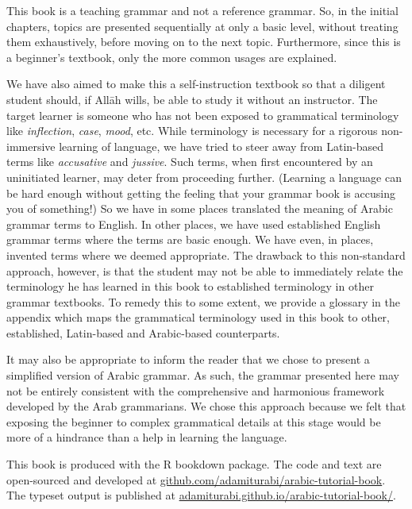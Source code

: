 \documentclass[
  10pt,
]{book}
\begin{document}
This book is a teaching grammar and not a reference grammar. So, in the initial chapters, topics are presented sequentially at only a basic level, without treating them exhaustively, before moving on to the next topic. Furthermore, since this is a beginner's textbook, only the more common usages are explained.

We have also aimed to make this a self-instruction textbook so that a diligent student should, if Allāh wills, be able to study it without an instructor. The target learner is someone who has not been exposed to grammatical terminology like \emph{inflection}, \emph{case}, \emph{mood}, etc. While terminology is necessary for a rigorous non-immersive learning of language, we have tried to steer away from Latin-based terms like \emph{accusative} and \emph{jussive}. Such terms, when first encountered by an uninitiated learner, may deter from proceeding further. (Learning a language can be hard enough without getting the feeling that your grammar book is accusing you of something!) So we have in some places translated the meaning of Arabic grammar terms to English. In other places, we have used established English grammar terms where the terms are basic enough. We have even, in places, invented terms where we deemed appropriate. The drawback to this non-standard approach, however, is that the student may not be able to immediately relate the terminology he has learned in this book to established terminology in other grammar textbooks. To remedy this to some extent, we provide a glossary in the appendix which maps the grammatical terminology used in this book to other, established, Latin-based and Arabic-based counterparts.

It may also be appropriate to inform the reader that we chose to present a simplified version of Arabic grammar. As such, the grammar presented here may not be entirely consistent with the comprehensive and harmonious framework developed by the Arab grammarians. We chose this approach because we felt that exposing the beginner to complex grammatical details at this stage would be more of a hindrance than a help in learning the language.

This book is produced with the R bookdown package. The code and text are open-sourced and developed at
\href{https://github.com/adamiturabi/arabic-tutorial-book}{github.com/adamiturabi/arabic-tutorial-book}.
The typeset output is published at
\href{https://adamiturabi.github.io/arabic-tutorial-book/}{adamiturabi.github.io/arabic-tutorial-book/}.
\end{document}

